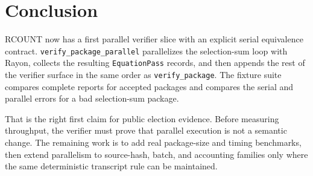 \section{Conclusion}

RCOUNT now has a first parallel verifier slice with an explicit serial
equivalence contract. \texttt{verify\_package\_parallel} parallelizes the
selection-sum loop with Rayon, collects the resulting \texttt{EquationPass}
records, and then appends the rest of the verifier surface in the same order as
\texttt{verify\_package}. The fixture suite compares complete reports for
accepted packages and compares the serial and parallel errors for a bad
selection-sum package.

That is the right first claim for public election evidence. Before measuring
throughput, the verifier must prove that parallel execution is not a semantic
change. The remaining work is to add real package-size and timing benchmarks,
then extend parallelism to source-hash, batch, and accounting families only
where the same deterministic transcript rule can be maintained.

